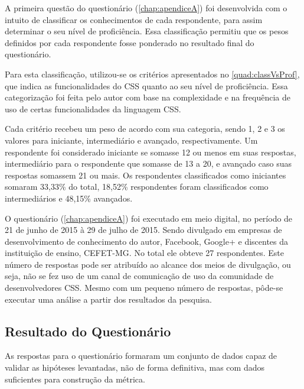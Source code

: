 A primeira questão do questionário (\autoref{chap:apendiceA}) foi desenvolvida com o intuito de classificar os conhecimentos de cada respondente, para assim determinar o seu nível de proficiência. Essa classificação permitiu que os pesos definidos por cada respondente fosse ponderado no resultado final do questionário.

Para esta classificação, utilizou-se os critérios apresentados no \autoref{quad:classVsProf}, que indica as funcionalidades do CSS quanto ao seu nível de proficiência. Essa categorização foi feita pelo autor com base na complexidade e na frequência de uso de certas funcionalidades da linguagem CSS.



Cada critério recebeu um peso de acordo com sua categoria, sendo 1, 2 e 3 os valores para iniciante, intermediário e avançado, respectivamente. Um respondente foi considerado iniciante se somasse 12 ou menos em suas respostas, intermediário para o respondente que somasse de 13 a 20, e avançado caso suas respostas somassem 21 ou mais. Os respondentes classificados como iniciantes somaram 33,33\% do total, 18,52\% respondentes foram classificados como intermediários e 48,15\% avançados.

O questionário (\autoref{chap:apendiceA}) foi executado em meio digital, no período de 21 de junho de 2015 à 29 de julho de 2015. Sendo divulgado em empresas de desenvolvimento de conhecimento do autor, Facebook, Google+ e discentes da instituição de ensino, CEFET-MG. No total ele obteve 27 respondentes. Este número de respostas pode ser atribuído ao alcance dos meios de divulgação, ou seja, não se fez uso de um canal de comunicação de uso da comunidade de desenvolvedores CSS. Mesmo com um pequeno número de respostas, pôde-se executar uma análise a partir dos resultados da pesquisa. 

\subsection{Resultado do Questionário}

As respostas para o questionário formaram um conjunto de dados capaz de validar as hipóteses levantadas, não de forma definitiva, mas com dados suficientes para construção da métrica.

